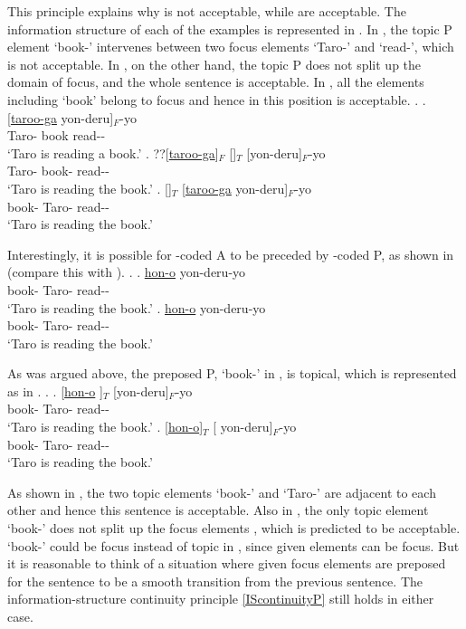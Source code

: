 This principle explains why \LLast[b] is not acceptable,
while \LLast[a,c] are acceptable.
The information structure of each of the examples \LLast is represented in \Next.
In \Next[b],
the topic P element  `book-' intervenes between two focus elements  `Taro-' and  `read-', which is not acceptable.
In \Next[c], on the other hand,
the topic P does not split up the domain of focus,
and the whole sentence is acceptable.
In \Next[a],
all the elements including  `book' belong to focus
and hence  in this position is acceptable.
%
\ex. \ag. [\ul{taroo-ga}  yon-deru]$_{F}$-yo \\
		Taro- book read-- \\
		`Taro is reading a book.'
	\bg. ??[\ul{taroo-ga}]$_{F}$ []$_{T}$ [yon-deru]$_{F}$-yo \\
		Taro- book- read-- \\
		`Taro is reading the book.'
	\bg. []$_{T}$ [\ul{taroo-ga} yon-deru]$_{F}$-yo \\
		book- Taro- read-- \\
		`Taro is reading the book.'

Interestingly,
it is possible for -coded A to be preceded by -coded P, as shown in \Next[a] (compare this with \Next[b]).
%
\ex.
\ag. \ul{hon-o}   yon-deru-yo \\
		book- Taro- read-- \\
		`Taro is reading the book.'
\bg. \ul{hon-o}  yon-deru-yo \\
		book- Taro- read-- \\
		`Taro is reading the book.'

As was argued above,
the preposed P,  `book-' in \Last,
is topical, which is represented as in \Next.
%
\ex.
\ag. [\ul{hon-o} ]$_{T}$  [yon-deru]$_{F}$-yo \\
		book- Taro- read-- \\
		`Taro is reading the book.'
\bg. [\ul{hon-o}]$_{T}$ [ yon-deru]$_{F}$-yo \\
		book- Taro- read-- \\
		`Taro is reading the book.'

As shown in \Last[a],
the two topic elements  `book-' and  `Taro-' are adjacent to each other and hence this sentence is acceptable.
Also in \Last[b],
the only topic element  `book-' does not split up the focus elements , which is predicted to be acceptable.
 `book-' could be focus instead of topic in \LLast[b], since given elements can be focus.
But it is reasonable to think of a situation where given focus elements are preposed
for the sentence to be a smooth transition from the previous sentence.
The information-structure continuity principle \ref{IScontinuityP} still holds in either case.

